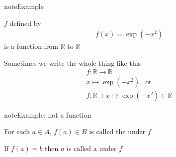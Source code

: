 \documentclass[letterpaper,10pt,english]{jupyterBook}
\begin{document}
\begin{sphinxadmonition}{note}{Example}

\sphinxAtStartPar
\(f\) defined by
\begin{equation*}
\begin{split}
f(x) = \exp(-x^2)
\end{split}
\end{equation*}
\sphinxAtStartPar
is a function from \(\mathbb{R}\) to \(\mathbb{R}\)

\sphinxAtStartPar
Sometimes we write the whole thing like this
\begin{equation*}
\begin{split}
f \colon \mathbb{R} \to \mathbb{R} \\
x \mapsto \exp(-x^2), \text{ or}\\
f \colon \mathbb{R} \ni x \mapsto \exp(-x^2) \in \mathbb{R} 
\end{split}
\end{equation*}\end{sphinxadmonition}

\begin{figure}[htbp]
\centering

\noindent{}
\end{figure}

\begin{sphinxadmonition}{note}{Example: not a function}

\begin{figure}[H]
\centering

\noindent{}
\end{figure}
\end{sphinxadmonition}

\sphinxAtStartPar
For each \(a \in A\), \(f(a) \in B\) is called the  under \(f\)

\begin{figure}[htbp]
\centering

\noindent{}
\end{figure}

\sphinxAtStartPar
If \(f(a) = b\) then \(a\) is called a  under \(f\)

\begin{figure}[htbp]
\centering

\noindent{}
\end{figure}
\end{document}
